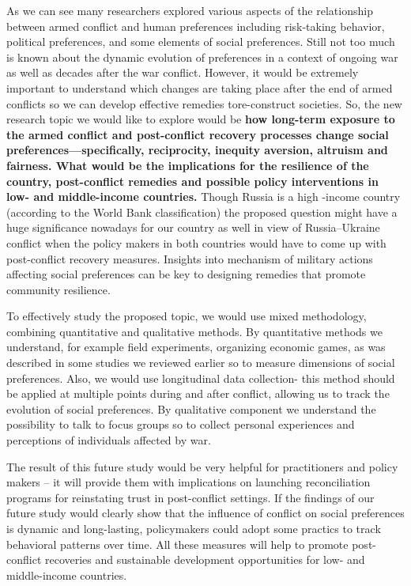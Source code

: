 \documentclass[14pt]{article}
\theoremstyle{remark}
\begin{document}
As we can see many researchers explored various aspects of the relationship between armed conflict and human preferences including risk-taking behavior, political preferences, and some elements of social preferences. Still not too much is known about the dynamic evolution of preferences in a context of ongoing war as well as decades after the war conflict. However, it would be extremely important to understand which changes are taking place after the end of armed conflicts so we can develop effective remedies tore-construct societies. So, the new research topic we would like to explore would be \textbf{how long-term exposure to the armed conflict and post-conflict recovery processes change social preferences---specifically, reciprocity, inequity aversion, altruism and fairness. What would be the implications for the resilience of the country, post-conflict remedies and possible policy interventions in low- and middle-income countries.} Though Russia is a high -income country (according to the World Bank classification) the proposed question might have a huge significance nowadays for our country as well in view of Russia--Ukraine conflict when the policy makers in both countries would have to come up with post-conflict recovery measures. Insights into mechanism of military actions affecting social preferences can be key to designing remedies that promote community resilience.

To effectively study the proposed topic, we would use mixed methodology, combining quantitative and qualitative methods. By quantitative methods we understand, for example field experiments, organizing economic games, as was described in some studies we reviewed earlier so to measure dimensions of social preferences. Also, we would use longitudinal data collection- this method should be applied at multiple points during and after conflict, allowing us to track the evolution of social preferences. By qualitative component we understand the possibility to talk to focus groups so to collect personal experiences and perceptions of individuals affected by war.

The result of this future study would be very helpful for practitioners and policy makers -- it will provide them with implications on launching reconciliation programs for reinstating trust in post-conflict settings. If the findings of our future study would clearly show that the influence of conflict on social preferences is dynamic and long-lasting, policymakers could adopt some practics to track behavioral patterns over time. All these measures will help to promote post-conflict recoveries and sustainable development opportunities for low- and middle-income countries.
\end{document}
